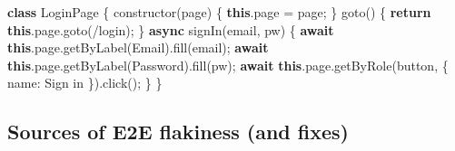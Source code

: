 \documentclass[11pt]{article}
\newenvironment{Shaded}{\begin{snugshade}}{\end{snugshade}}
\newcommand{\AttributeTok}[1]{\textcolor[rgb]{0.16,0.50,0.73}{#1}}
\newcommand{\ControlFlowTok}[1]{\textcolor[rgb]{0.99,0.74,0.29}{\textbf{#1}}}
\newcommand{\DataTypeTok}[1]{\textcolor[rgb]{0.16,0.50,0.73}{#1}}
\newcommand{\FunctionTok}[1]{\textcolor[rgb]{0.56,0.27,0.68}{#1}}
\newcommand{\KeywordTok}[1]{\textcolor[rgb]{0.81,0.81,0.76}{\textbf{#1}}}
\newcommand{\NormalTok}[1]{\textcolor[rgb]{0.81,0.81,0.76}{#1}}
\newcommand{\OperatorTok}[1]{\textcolor[rgb]{0.81,0.81,0.76}{#1}}
\newcommand{\StringTok}[1]{\textcolor[rgb]{0.96,0.31,0.31}{#1}}
\begin{document}

\begin{Shaded}
\begin{Highlighting}[]
\KeywordTok{class}\NormalTok{ LoginPage \{}
  \FunctionTok{constructor}\NormalTok{(page) \{ }\KeywordTok{this}\OperatorTok{.}\AttributeTok{page} \OperatorTok{=}\NormalTok{ page}\OperatorTok{;}\NormalTok{ \}}
  \FunctionTok{goto}\NormalTok{()  \{ }\ControlFlowTok{return} \KeywordTok{this}\OperatorTok{.}\AttributeTok{page}\OperatorTok{.}\FunctionTok{goto}\NormalTok{(}\StringTok{\textquotesingle{}/login\textquotesingle{}}\NormalTok{)}\OperatorTok{;}\NormalTok{ \}}
  \KeywordTok{async} \FunctionTok{signIn}\NormalTok{(email}\OperatorTok{,}\NormalTok{ pw) \{}
    \ControlFlowTok{await} \KeywordTok{this}\OperatorTok{.}\AttributeTok{page}\OperatorTok{.}\FunctionTok{getByLabel}\NormalTok{(}\StringTok{\textquotesingle{}Email\textquotesingle{}}\NormalTok{)}\OperatorTok{.}\FunctionTok{fill}\NormalTok{(email)}\OperatorTok{;}
    \ControlFlowTok{await} \KeywordTok{this}\OperatorTok{.}\AttributeTok{page}\OperatorTok{.}\FunctionTok{getByLabel}\NormalTok{(}\StringTok{\textquotesingle{}Password\textquotesingle{}}\NormalTok{)}\OperatorTok{.}\FunctionTok{fill}\NormalTok{(pw)}\OperatorTok{;}
    \ControlFlowTok{await} \KeywordTok{this}\OperatorTok{.}\AttributeTok{page}\OperatorTok{.}\FunctionTok{getByRole}\NormalTok{(}\StringTok{\textquotesingle{}button\textquotesingle{}}\OperatorTok{,}\NormalTok{ \{ }\DataTypeTok{name}\OperatorTok{:} \StringTok{\textquotesingle{}Sign in\textquotesingle{}}\NormalTok{ \})}\OperatorTok{.}\FunctionTok{click}\NormalTok{()}\OperatorTok{;}
\NormalTok{  \}}
\NormalTok{\}}
\end{Highlighting}
\end{Shaded}

\subsection{Sources of E2E flakiness (and fixes)}\label{sources-of-e2e-flakiness-and-fixes}

\end{document}
